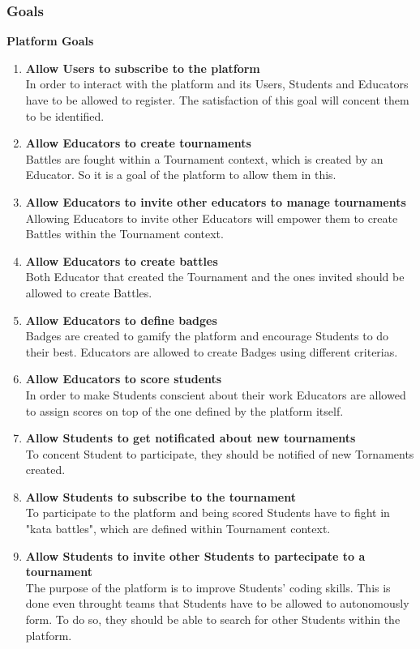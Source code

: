 \documentclass{article}
\begin{document}
\subsubsection{Goals}
\textbf{Platform Goals}
\begin{enumerate}[label=$\bullet$ \textbf{GP\arabic*:}]
    \item \textbf{Allow Users to subscribe to the platform}\\In order to interact with the platform and its Users, Students and Educators have to be allowed to register. The satisfaction of this goal will concent them to be identified.
    \item \textbf{Allow Educators to create tournaments}\\Battles are fought within a Tournament context, which is created by an Educator. So it is a goal of the platform to allow them in this. 
    \item \textbf{Allow Educators to invite other educators to manage tournaments}\\Allowing Educators to invite other Educators will empower them to create Battles within the Tournament context. 
    \item \textbf{Allow Educators to create battles}\\Both Educator that created the Tournament and the ones invited should be allowed to create Battles. 
    \item \textbf{Allow Educators to define badges}\\Badges are created to gamify the platform and encourage Students to do their best. Educators are allowed to create Badges using different criterias.
    \item \textbf{Allow Educators to score students}\\In order to make Students conscient about their work Educators are allowed to assign scores on top of the one defined by the platform itself.
    \item \textbf{Allow Students to get notificated about new tournaments}\\To concent Student to participate, they should be notified of new Tornaments created.
    \item \textbf{Allow Students to subscribe to the tournament}\\To participate to the platform and being scored Students have to fight in "kata battles", which are defined within Tournament context.
    \item \textbf{Allow Students to invite other Students to partecipate to a tournament}\\The purpose of the platform is to improve Students' coding skills. This is done even throught teams that Students have to be allowed to autonomously form. To do so, they should be able to search for other Students within the platform.
\end{enumerate}
\end{document}
